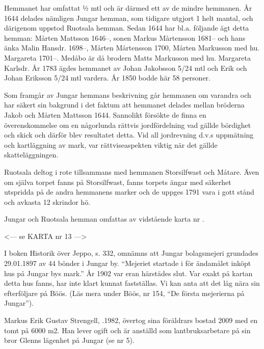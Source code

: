 Hemmanet har omfattat ½ mtl och är därmed ett av de mindre hemmanen. År 1644 delades nämligen Jungar hemman, som tidigare utgjort 1 helt mantal, och därigenom uppstod Ruotsala hemman. Sedan 1644 har bl.a. följande ägt detta hemman:
Mårten Mattsson 1646--, sonen Markus Mårtensson 1681-- och hans änka Malin Hansdr. 1698--, Mårten Mårtensson  1700, Mårten Markusson med hu. Margareta 1701--. Medåbo är då brodern Matts Markusson med hu. Margareta Karlsdr. År 1783 ägdes hemmanet av Johan Jakobsson 5/24 mtl och Erik och Johan Eriksson 5/24 mtl vardera. År 1850 bodde här 58 personer.

Som framgår av Jungar hemmans beskrivning går hemmanen om varandra och har säkert sin bakgrund i det faktum att hemmanet delades mellan bröderna Jakob och Mårten Mattsson 1644. Sannolikt försökte de finna en överenskommelse om en någorlunda rättvis jordfördelning vad gällde bördighet och skick och därför blev resultatet detta. Vid all jordrevning d.v.s uppmätning och kartläggning av mark, var rättviseaspekten viktig när det gällde skatteläggningen.

Ruotsala deltog i rote tillsammans med hemmanen Storsilfwast och Måtare. Även om själva torpet fanns på Storsilfwast, fanns torpets ängar med säkerhet utspridda på de andra hemmanens marker och de uppges 1791 vara i gott stånd och avkasta 12 skrindor hö.


Jungar och Ruotsala hemman omfattas av vidstående karta nr .


<--- se KARTA nr 13 --->






I boken Historik över Jeppo, s. 332, omnämns att Jungar bolagsmejeri grundades 29.01.1897 av 44 bönder i Jungar by. ``Mejeriet startade i för ändamålet inköpt hus på Jungar bys mark.'' År 1902 var eran härstädes slut. Var exakt på kartan detta hus fanns, har inte klart kunnat fastställas. Vi kan anta att det låg nära sin efterföljare på Böös. (Läs mera under Böös, nr 154, ``De första mejerierna på Jungar'').\jhvspace{}





Markus Erik Gustav Strengell, .1982, övertog sina föräldrars bostad 2009 med en tomt på 6000 m2. Han lever ogift och är anställd som lantbruksarbetare på sin bror Glenns lägenhet på Jungar (se nr 5).\jhvspace{}


